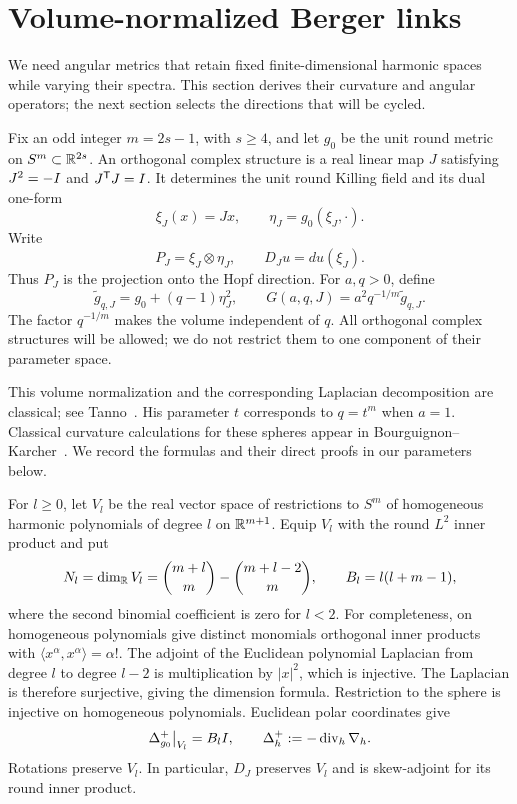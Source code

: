 \section{Volume-normalized Berger links}
\label{sec:links}

We need angular metrics that retain fixed finite-dimensional harmonic spaces
while varying their spectra. This section derives their curvature and angular
operators; the next section selects the directions that will be cycled.

Fix an odd integer \(m=2s-1\), with \(s\geq4\), and let \(g_0\) be the
unit round metric on \(S^m\subset\mathbb R^{2s}\).
An orthogonal complex structure is a real linear map \(J\) satisfying
\(J^2=-I\) and \(J^{\mathsf T}J=I\).
It determines the unit round Killing field and its dual one-form
\[
 \xi_J(x)=Jx,\qquad \eta_J=g_0(\xi_J,\cdot).
\]
Write
\[
 P_J=\xi_J\otimes\eta_J,\qquad D_Ju=du(\xi_J).
\]
Thus \(P_J\) is the projection onto the Hopf direction.
For \(a,q>0\), define
\[
 \widetilde g_{q,J}=g_0+(q-1)\eta_J^2,\qquad
 G(a,q,J)=a^2q^{-1/m}\widetilde g_{q,J}.
\]
The factor \(q^{-1/m}\) makes the volume independent of \(q\).
All orthogonal complex structures will be allowed; we do not restrict
them to one component of their parameter space.

This volume normalization and the corresponding Laplacian decomposition
are classical; see Tanno~\cite[Sections~2--4]{Tanno}.
His parameter \(t\) corresponds to \(q=t^m\) when \(a=1\).
Classical curvature calculations for these spheres appear in
Bourguignon--Karcher~\cite[Section~6.6]{BourguignonKarcher}.
We record the formulas and their direct proofs in our parameters below.

For \(l\geq0\), let \(V_l\) be the real vector space of restrictions to
\(S^m\) of homogeneous harmonic polynomials of degree \(l\) on
\(\mathbb R^{m+1}\).  Equip \(V_l\) with the round \(L^2\) inner product and put
\[
 N_l=\dim_{\mathbb R}V_l
     =\binom{m+l}{m}-\binom{m+l-2}{m},
 \qquad B_l=l(l+m-1),
\]
where the second binomial coefficient is zero for \(l<2\).
For completeness, on homogeneous polynomials give distinct monomials
orthogonal inner products with
\(\langle x^\alpha,x^\alpha\rangle=\alpha!\).
The adjoint of the Euclidean polynomial Laplacian from degree \(l\) to
degree \(l-2\) is multiplication by \(|x|^2\), which is injective.
The Laplacian is therefore surjective, giving the dimension formula.
Restriction to the sphere is injective on homogeneous polynomials.
Euclidean polar coordinates give
\[
 \Delta_{g_0}^{+}\big|_{V_l}=B_lI,
 \qquad \Delta_h^{+}:=-\operatorname{div}_h\nabla_h.
\]
Rotations preserve \(V_l\).  In particular, \(D_J\) preserves \(V_l\)
and is skew-adjoint for its round inner product.


